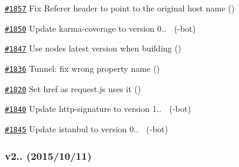 \begin{DoxyItemize}
\item \href{https://github.com/request/request/pull/1857}{\tt \#1857} Fix Referer header to point to the original host name ()
\item \href{https://github.com/request/request/pull/1850}{\tt \#1850} Update karma-\/coverage to version 0.. 🚀 (-\/bot)
\item \href{https://github.com/request/request/pull/1847}{\tt \#1847} Use node\textquotesingle{}s latest version when building ()
\item \href{https://github.com/request/request/pull/1836}{\tt \#1836} Tunnel\+: fix wrong property name ()
\item \href{https://github.com/request/request/pull/1820}{\tt \#1820} Set href as request.\+js uses it ()
\item \href{https://github.com/request/request/pull/1840}{\tt \#1840} Update http-\/signature to version 1.. 🚀 (-\/bot)
\item \href{https://github.com/request/request/pull/1845}{\tt \#1845} Update istanbul to version 0.. 🚀 (-\/bot)
\end{DoxyItemize}

\subsubsection*{v2.. (2015/10/11)}


